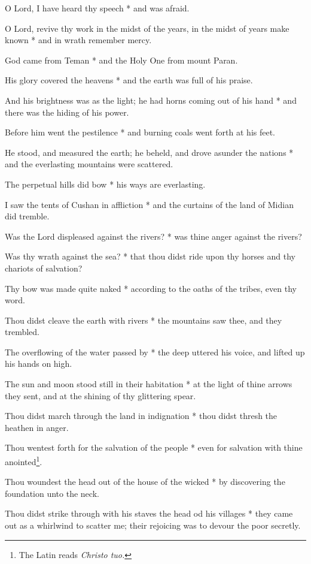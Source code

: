 O Lord, I have heard thy speech * and was afraid.

O Lord, revive thy work in the midst of the years, in the midst of years make known * and in wrath remember mercy.

God came from Teman * and the Holy One from mount Paran.

His glory covered the heavens * and the earth was full of his praise.

And his brightness was as the light; he had horns coming out of his hand * and there was the hiding of his power.

Before him went the pestilence * and burning coals went forth at his feet.

He stood, and measured the earth; he beheld, and drove asunder the nations * and the everlasting mountains were scattered.

The perpetual hills did bow * his ways are everlasting.

I saw the tents of Cushan in affliction * and the curtains of the land of Midian did tremble.

Was the Lord displeased against the rivers? * was thine anger against the rivers?

Was thy wrath against the sea? * that thou didst ride upon thy horses and thy chariots of salvation?

Thy bow was made quite naked * according to the oaths of the tribes, even thy word.

Thou didst cleave the earth with rivers * the mountains saw thee, and they trembled.

The overflowing of the water passed by * the deep uttered his voice, and lifted up his hands on high.

The sun and moon stood still in their habitation * at the light of thine arrows they sent, and at the shining of thy glittering spear.

Thou didst march through the land in indignation * thou didst thresh the heathen in anger.

Thou wentest forth for the salvation of the people * even for salvation with thine anointed\footnote{The Latin reads \textit{Christo tuo.}}.

Thou woundest the head out of the house of the wicked * by discovering the foundation unto the neck.

Thou didst strike through with his staves the head od his villages * they came out as a whirlwind to scatter me; their rejoicing was to devour the poor secretly.

